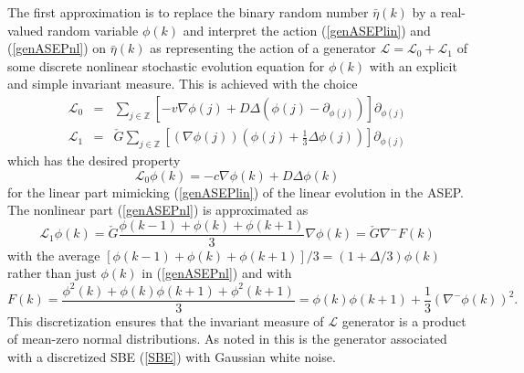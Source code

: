 \documentclass[12pt]{article}
\newcommand{\Z}{{\mathbb Z}}
\begin{document}
The first approximation is to replace the binary random number 
$\bar{\eta}(k)$ by a real-valued random variable $\phi(k)$ and 
interpret the action (\ref{genASEPlin}) and (\ref{genASEPnl}) on 
$\bar{\eta}(k)$ as representing the action of a generator
$\mathcal{L} = \mathcal{L}_0 + \mathcal{L}_1$ of some discrete 
nonlinear stochastic evolution equation for $\phi(k)$ with an explicit 
and simple invariant measure. This is achieved with the choice
\begin{eqnarray}
\mathcal{L}_0 & = & \sum_{j\in\Z} \left[- v \nabla \phi(j) + 
D \Delta \left(\phi(j) - \partial_{\phi(j)}\right)\right] 
\partial_{\phi(j)} \\
\mathcal{L}_1 & = & \check{G} \sum_{j\in\Z} \left[\left(\nabla \phi(j) \right) \left(\phi(j) + 
\frac{1}{3} \Delta \phi(j)\right)\right] 
\partial_{\phi(j)} 
\end{eqnarray}
which has the desired property
\begin{equation}
\mathcal{L}_0 \phi(k) = - c \nabla \phi(k) + 
D \Delta \phi(k)
\label{gendSBElin}
\end{equation}
for the linear part mimicking (\ref{genASEPlin}) of the linear
evolution in the ASEP.
 The nonlinear part (\ref{genASEPnl}) is approximated as
\begin{equation}
\mathcal{L}_1 \phi(k) = \check{G} \frac{\phi(k-1) + \phi(k) + 
\phi(k+1)}{3} \nabla \phi(k) = \check{G} \nabla^- F(k)
\label{gendSBEnl}
\end{equation}
with the average $[\phi(k-1) + \phi(k) + \phi(k+1)]/3 = 
(1+ \Delta/3) \phi(k) $ rather
than just $\phi(k)$ in (\ref{genASEPnl})
and with
\begin{equation}
F(k) = \frac{\phi^2(k) + \phi(k) \phi(k+1)
+ \phi^2(k+1)}{3} =
\phi(k) \phi(k+1) + \frac{1}{3} \left(\nabla^- \phi(k)\right)^2.
\label{dSBEnl}
\end{equation}
This discretization ensures that the invariant measure of 
$\mathcal{L}$ generator is a product of mean-zero normal 
distributions. As noted in \cite{Spoh14} this is the generator 
associated with a discretized SBE (\ref{SBE}) with Gaussian 
white noise.
\end{document}
